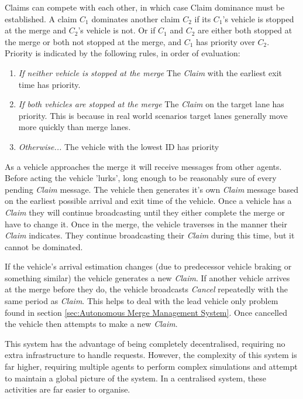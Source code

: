 Claims can compete with each other, in which case Claim dominance must be established. A claim $C_1$ dominates another claim $C_2$ if its $C_1$'s vehicle is stopped at the merge and $C_2$'s vehicle is not. Or if $C_1$ and $C_2$ are either both stopped at the merge or both not stopped at the merge, and $C_1$ has priority over $C_2$. Priority is indicated by the following rules, in order of evaluation:

\begin{enumerate}
\item \emph{If neither vehicle is stopped at the merge} The \emph{Claim} with the earliest exit time has priority.
\item \emph{If both vehicles are stopped at the merge} The \emph{Claim} on the target lane has priority. This is because in real world scenarios target lanes generally move more quickly than merge lanes.
\item \emph{Otherwise...} The vehicle with the lowest ID has priority
\end{enumerate}

As a vehicle approaches the merge it will receive messages from other agents. Before acting the vehicle 'lurks', long enough to be reasonably sure of every pending \emph{Claim} message. The vehicle then generates it's own \emph{Claim} message based on the earliest possible arrival and exit time of the vehicle. Once a vehicle has a \emph{Claim} they will continue broadcasting until they either complete the merge or have to change it. Once in the merge, the vehicle traverses in the manner their \emph{Claim} indicates. They continue broadcasting their \emph{Claim} during this time, but it cannot be dominated. 

If the vehicle's arrival estimation changes (due to predecessor vehicle braking or something similar) the vehicle generates a new \emph{Claim}. If another vehicle arrives at the merge before they do, the vehicle broadcasts \emph{Cancel} repeatedly with the same period as \emph{Claim}. This helps to deal with the lead vehicle only problem found in section \ref{sec:Autonomous Merge Management System}. Once cancelled the vehicle then attempts to make a new \emph{Claim}.

This system has the advantage of being completely decentralised, requiring no extra infrastructure to handle requests. However, the complexity of this system is far higher, requiring multiple agents to perform complex simulations and attempt to maintain a global picture of the system. In a centralised system, these activities are far easier to organise.